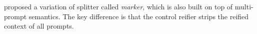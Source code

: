 \documentclass[12pt,phd,lfcs,twoside,openright,logo,leftchapter,normalheadings]{infthesis}
\theoremstyle{plain}
\theoremstyle{definition}
\begin{document}
\citet{MoreauQ94} proposed a variation of splitter called
\emph{marker}, which is also built on top of multi-prompt
semantics. The key difference is that the control reifier strips the
reified context of all prompts.
%

\end{document}
